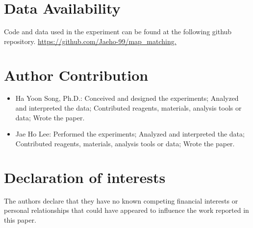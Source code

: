 \documentclass[preprint,12pt]{elsarticle}
\begin{document}
\section{Data Availability}
\label{sec:sec6}
Code and data used in the experiment can be found at the following github repository. 
\url{https://github.com/Jaeho-99/map_matching.}

\section{Author Contribution}
\label{sec:sec7}
\begin{itemize}
	\item Ha Yoon Song, Ph.D.: Conceived and designed the experiments; Analyzed and interpreted the data; Contributed reagents, materials, analysis tools or data; Wrote the paper.
	\item Jae Ho Lee: Performed the experiments; Analyzed and interpreted the data; Contributed reagents, materials, analysis tools or data; Wrote the paper.
\end{itemize}

\section{Declaration of interests}
\label{sec:sec8}
The authors declare that they have no known competing financial interests or personal relationships that could have appeared to influence the work reported in this paper.








\end{document}

